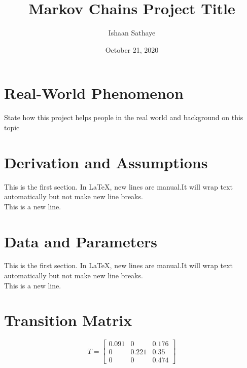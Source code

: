 \documentclass{article}
\title{Markov Chains Project Title}
\author{Ishaan Sathaye }
\date{October 21, 2020}
\begin{document}
\maketitle

\section{Real-World Phenomenon}
State how this project helps people in the real world and background on this topic

\section{Derivation and Assumptions}
This is the first section. In LaTeX, new lines are manual.It will wrap text automatically but not make new line breaks.\\ 
This is a new line.

\section{Data and Parameters}
This is the first section. In LaTeX, new lines are manual.It will wrap text automatically but not make new line breaks.\\ 
This is a new line.

\section{Transition Matrix}

$$
T = 
\begin{bmatrix}
0.091 & 0 & 0.176 \\ %
0 & 0.221 & 0.35 \\ %
0 & 0 & 0.474    %
\end{bmatrix}
$$
\end{document}
